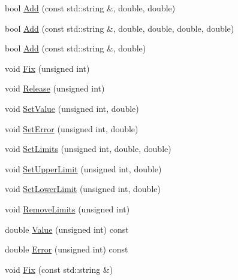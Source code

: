 \begin{DoxyCompactItemize}
\item 
bool \mbox{\hyperlink{classROOT_1_1Minuit2_1_1MnUserTransformation_a2ddcd7b0cc5234b386407d7a76db1720}{Add}} (const std\+::string \&, double, double)
\item 
bool \mbox{\hyperlink{classROOT_1_1Minuit2_1_1MnUserTransformation_a173dea97b7be768e54b669c53b92c2dc}{Add}} (const std\+::string \&, double, double, double, double)
\item 
bool \mbox{\hyperlink{classROOT_1_1Minuit2_1_1MnUserTransformation_acf1aa6f4f5c65405a3b9e700ae806e44}{Add}} (const std\+::string \&, double)
\item 
void \mbox{\hyperlink{classROOT_1_1Minuit2_1_1MnUserTransformation_ad3447936f5ae547aa3f80a76efa5e35d}{Fix}} (unsigned int)
\item 
void \mbox{\hyperlink{classROOT_1_1Minuit2_1_1MnUserTransformation_acc0c7437f21dc53d1d56d62f7a82d352}{Release}} (unsigned int)
\item 
void \mbox{\hyperlink{classROOT_1_1Minuit2_1_1MnUserTransformation_a62f598ff8d0c916c496f495440101d9c}{Set\+Value}} (unsigned int, double)
\item 
void \mbox{\hyperlink{classROOT_1_1Minuit2_1_1MnUserTransformation_a6256d78c2aafb1142eadc811ee981d79}{Set\+Error}} (unsigned int, double)
\item 
void \mbox{\hyperlink{classROOT_1_1Minuit2_1_1MnUserTransformation_ad45b1ae620fbf8ca9f77846b80cca808}{Set\+Limits}} (unsigned int, double, double)
\item 
void \mbox{\hyperlink{classROOT_1_1Minuit2_1_1MnUserTransformation_a276c83d584ef857cd2b69ecc04cfab01}{Set\+Upper\+Limit}} (unsigned int, double)
\item 
void \mbox{\hyperlink{classROOT_1_1Minuit2_1_1MnUserTransformation_a380498bdd8801393713fde4a4835402e}{Set\+Lower\+Limit}} (unsigned int, double)
\item 
void \mbox{\hyperlink{classROOT_1_1Minuit2_1_1MnUserTransformation_aa7b791dee11011a7442e44c85c06d650}{Remove\+Limits}} (unsigned int)
\item 
double \mbox{\hyperlink{classROOT_1_1Minuit2_1_1MnUserTransformation_a63d57196d60559aa9df6c9c499cd21d0}{Value}} (unsigned int) const
\item 
double \mbox{\hyperlink{classROOT_1_1Minuit2_1_1MnUserTransformation_a9d7f873342a58fe078edd10cc2175faf}{Error}} (unsigned int) const
\item 
void \mbox{\hyperlink{classROOT_1_1Minuit2_1_1MnUserTransformation_ad01d6c104e0c4a26c2ebb34db0ba1752}{Fix}} (const std\+::string \&)

\end{DoxyCompactItemize}
